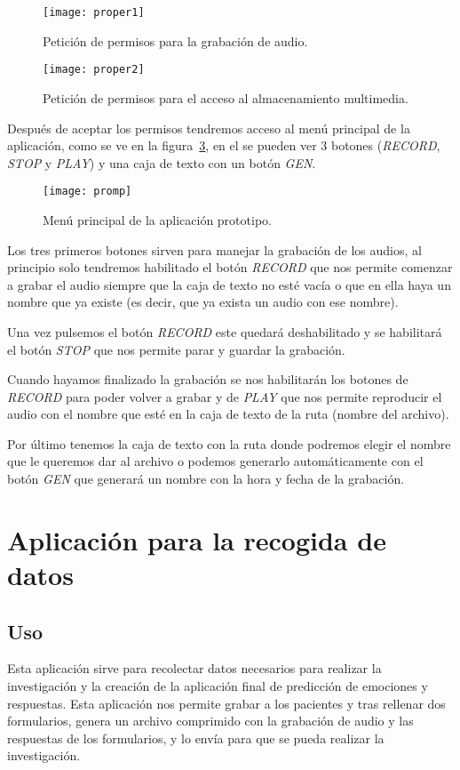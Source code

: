 \begin{figure}[H]
	\centering
	\texttt{[image: proper1]}
	\caption{Petición de permisos para la grabación de audio.}
	\label{fig:properr1}
\end{figure}

\begin{figure}[H]
	\centering
	\texttt{[image: proper2]}
	\caption{Petición de permisos para el acceso al almacenamiento multimedia.}
	\label{fig:proper2}
\end{figure}

Después de aceptar los permisos tendremos acceso al menú principal de la aplicación, como se ve en la figura~\ref{fig:promp}, en el se pueden ver 3 botones (\textit{RECORD}, \textit{STOP} y \textit{PLAY}) y una caja de texto con un botón \textit{GEN}.

\begin{figure}[H]
	\centering
	\texttt{[image: promp]}
	\caption{Menú principal de la aplicación prototipo.}
	\label{fig:promp}
\end{figure}

Los tres primeros botones sirven para manejar la grabación de los audios, al principio solo tendremos habilitado el botón \textit{RECORD} que nos permite comenzar a grabar el audio siempre que la caja de texto no esté vacía o que en ella haya un nombre que ya existe (es decir, que ya exista un audio con ese nombre).

Una vez pulsemos el botón \textit{RECORD} este quedará deshabilitado y se habilitará el botón \textit{STOP} que nos permite parar y guardar la grabación.

Cuando hayamos finalizado la grabación se nos habilitarán los botones de \textit{RECORD} para poder volver a grabar y de \textit{PLAY} que nos permite reproducir el audio con el nombre que esté en la caja de texto de la ruta (nombre del archivo).

Por último tenemos la caja de texto con la ruta donde podremos elegir el nombre que le queremos dar al archivo o podemos generarlo automáticamente con el botón \textit{GEN} que generará un nombre con la hora y fecha de la grabación.
\section{Aplicación para la recogida de datos}
\subsection{Uso}
Esta aplicación sirve para recolectar datos necesarios para realizar la investigación y la creación de la aplicación final de predicción de emociones y respuestas. Esta aplicación nos permite grabar a los pacientes y tras rellenar dos formularios, genera un archivo comprimido con la grabación de audio y las respuestas de los formularios, y lo envía para que se pueda realizar la investigación.

